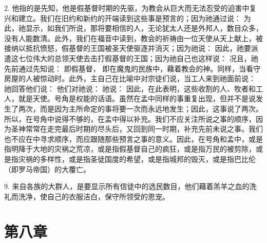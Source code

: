 2.  他指的是先知，他是假基督时期的先驱，为教会从巨大而无法忍受的迫害中复兴和建立。我们在旧约和新约的开端读到这些事是预言的；因为祂通过说： 为此，祂显示，如我们所说，那将要相信的人，无论犹太人还是外邦人，数目众多，没有人能数清。此外，我们在福音中读到，教会的祈祷由一位天使从天上献上，被接纳以抵抗愤怒，假基督的王国被圣天使驱逐并消灭；因为祂说：  因此，祂要派遣这七位伟大的总领天使去击打假基督的王国；因为祂自己也这样说：  况且，祂先前通过先知说： 即假基督，  即在魔鬼的民族中，藉着教会的神。同样，当看守房屋的人被惊动时。此外，主自己在比喻中对宗徒们说，当工人来到祂面前说： 祂回答他们说： 他们对祂说： 祂说：  因此，在此表明，这些收割的人、牧者和工人，就是天使。号角是权能的话语。虽然在孟中同样的事重复出现，但并不是说发生了两次，而是因为主所命定的事将要一次而永远地发生；因此，这事说了两次。所以，在号角中说得不够的，在孟中得以补充。我们不应关注所说之事的顺序，因为圣神常常在走完最后时期的尽头后，又回到同一时期，补充先前未说之事。我们也不应在中寻求顺序，而应跟随那些预言之事的意义。因此，在号角和孟中，或是指明降于大地的灾祸之荒凉，或是指假基督自己的疯狂，或是指万民的被剪除，或是指灾祸的多样性，或是指圣徒国度的希望，或是指城邦的毁灭，或是指巴比伦（即罗马帝国）的大覆亡。\par

9.  来自各族的大群人，是要显示所有信徒中的选民数目，他们藉着羔羊之血的洗礼而洗净，使自己的衣服洁白，保守所领受的恩宠。\par


\section{第八章}

